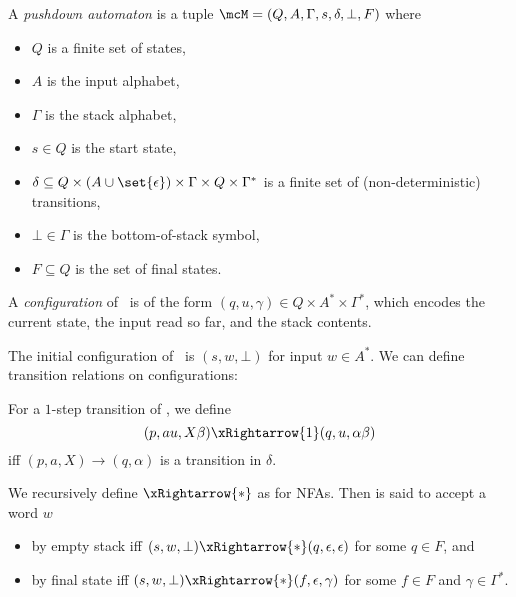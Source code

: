 \begin{definition*} \label{def:pda}
    A \emph{pushdown automaton} is a tuple
    $\mcM = (Q, A, \Gamma, s, \delta, \bot, F)$ where
    \begin{itemize}
        \item $Q$ is a finite set of states,
        \item $A$ is the input alphabet,
        \item $\Gamma$ is the stack alphabet,
        \item $s \in Q$ is the start state,
        \item $\delta \subseteq Q
            \times (A \cup \set{\epsilon})
            \times \Gamma
            \times Q
            \times \Gamma^*$ is a finite set of (non-deterministic)
            transitions,
        \item $\bot \in \Gamma$ is the bottom-of-stack symbol,
        \item $F \subseteq Q$ is the set of final states.
    \end{itemize}
    A \emph{configuration} of \mcM\ is of the form
    $(q, u, \gamma) \in Q \times A^* \times \Gamma^*$,
    which encodes the current state,
                  the input read so far,
              and the stack contents.
\end{definition*}
The initial configuration of \mcM\ is $(s, w, \bot)$ for input $w \in A^*$.
We can define transition relations on configurations:
\begin{definition*}
    For a $1$-step transition of \mcM, we define \[
        (p, au, X\beta) \xRightarrow{1} (q, u, \alpha\beta)
    \] iff $(p, a, X) \to (q, \alpha)$ is a transition in $\delta$.

    We recursively define $\xRightarrow{*}$ as for NFAs.
    Then \mcM is said to accept a word $w$
    \begin{itemize}
        \item by empty stack iff
        $(s, w, \bot) \xRightarrow{*} (q, \epsilon, \epsilon)$
        for some $q \in F$, and
        \item by final state iff
        $(s, w, \bot) \xRightarrow{*} (f, \epsilon, \gamma)$
        for some $f \in F$ and $\gamma \in \Gamma^*$.
    \end{itemize}
\end{definition*}

